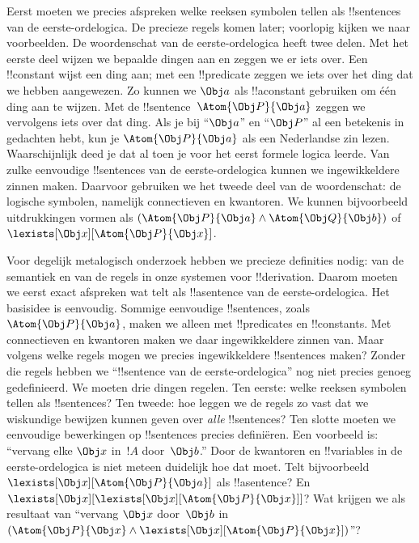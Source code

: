 \documentclass[openany]{memoir}
\begin{document}
Eerst moeten we precies afspreken welke reeksen symbolen tellen als
!!{sentence}s van de eerste-ordelogica. De precieze regels komen later;
voorlopig kijken we naar voorbeelden. De woordenschat van de
eerste-ordelogica heeft twee delen. Met het eerste deel wijzen we
bepaalde dingen aan en zeggen we er iets over. Een !!{constant} wijst
een ding aan; met een !!{predicate} zeggen we iets over het ding dat
we hebben aangewezen. Zo kunnen we $\Obj a$ als !!a{constant} gebruiken
om één ding aan te wijzen. Met de !!{sentence}~$\Atom{\Obj P}{\Obj a}$
zeggen we vervolgens iets over dat ding. Als je bij ``$\Obj a$'' en
``$\Obj P$'' al een betekenis in gedachten hebt, kun je
$\Atom{\Obj P}{\Obj a}$ als een Nederlandse zin lezen. Waarschijnlijk
deed je dat al toen je voor het eerst formele logica leerde. Van zulke
eenvoudige !!{sentence}s van de eerste-ordelogica kunnen we
ingewikkeldere zinnen maken. Daarvoor gebruiken we het tweede deel van
de woordenschat: de logische symbolen, namelijk connectieven en
kwantoren. We kunnen bijvoorbeeld uitdrukkingen vormen als
$(\Atom{\Obj P}{\Obj a} \land \Atom{\Obj Q}{\Obj b})$
of~$\lexists[\Obj x][\Atom{\Obj P}{\Obj x}]$.

Voor degelijk metalogisch onderzoek hebben we precieze definities
nodig: van de semantiek en van de regels in onze systemen voor
!!{derivation}. Daarom moeten we eerst exact afspreken wat telt als
!!a{sentence} van de eerste-ordelogica. Het basisidee is eenvoudig.
Sommige eenvoudige !!{sentence}s, zoals~$\Atom{\Obj P}{\Obj a}$, maken
we alleen met !!{predicate}s en !!{constant}s. Met connectieven en
kwantoren maken we daar ingewikkeldere zinnen van. Maar volgens welke
regels mogen we precies ingewikkeldere !!{sentence}s maken? Zonder die
regels hebben we ``!!{sentence} van de eerste-ordelogica'' nog niet
precies genoeg gedefinieerd. We moeten drie dingen regelen. Ten eerste:
welke reeksen symbolen tellen als !!{sentence}s? Ten tweede: hoe leggen
we de regels zo vast dat we wiskundige bewijzen kunnen geven over
\emph{alle} !!{sentence}s? Ten slotte moeten we eenvoudige bewerkingen
op !!{sentence}s precies definiëren. Een voorbeeld is: ``vervang elke
$\Obj x$ in~$!A$ door~$\Obj b$.'' Door de kwantoren en !!{variable}s in
de eerste-ordelogica is niet meteen duidelijk hoe dat moet. Telt
bijvoorbeeld $\lexists[\Obj x][\Atom{\Obj P}{\Obj a}]$ als
!!a{sentence}? En
$\lexists[\Obj x][\lexists[\Obj x][\Atom{\Obj P}{\Obj x}]]$? Wat
krijgen we als resultaat van ``vervang $\Obj x$ door~$\Obj b$ in
$(\Atom{\Obj P}{\Obj x} \land \lexists[\Obj x][\Atom{\Obj P}{\Obj
x}])$''?
\endgroup
\end{document}
